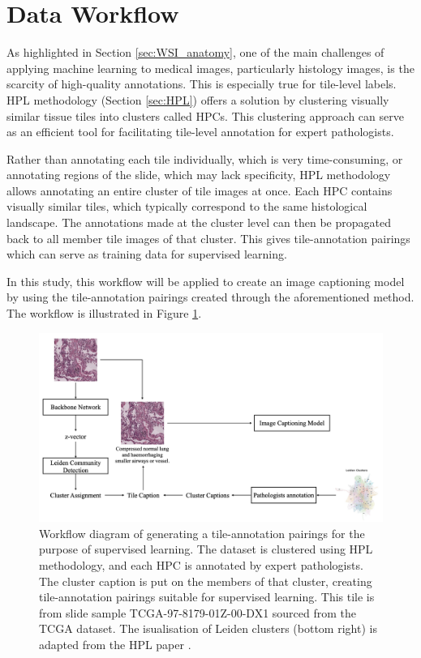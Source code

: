 \documentclass{l4proj}
\begin{document}
\section{Data Workflow} \label{sec:data-workflow}
As highlighted in Section \ref{sec:WSI_anatomy}, one of the main challenges of applying machine learning to medical images, particularly histology images, is the scarcity of high-quality annotations. This is especially true for tile-level labels. HPL methodology (Section \ref{sec:HPL}) offers a solution by clustering visually similar tissue tiles into clusters called HPCs. This clustering approach can serve as an efficient tool for facilitating tile-level annotation for expert pathologists.

Rather than annotating each tile individually, which is very time-consuming, or annotating regions of the slide, which may lack specificity, HPL methodology allows annotating an entire cluster of tile images at once. Each HPC contains visually similar tiles, which typically correspond to the same histological landscape. The annotations made at the cluster level can then be propagated back to all member tile images of that cluster. This gives tile-annotation pairings which can serve as training data for supervised learning.

In this study, this workflow will be applied to create an image captioning model by using the tile-annotation pairings created through the aforementioned method. The workflow is illustrated in Figure \ref{fig:data-workflow}. 

\begin{figure}[h]
    \centering
    \includegraphics[width=1\linewidth]{images/workflow_diagram.png}
    \caption{Workflow diagram of generating a tile-annotation pairings for the purpose of supervised learning. The dataset is clustered using HPL methodology, and each HPC is annotated by expert pathologists. The cluster caption is put on the members of that cluster, creating tile-annotation pairings suitable for supervised learning. This tile is from slide sample TCGA-97-8179-01Z-00-DX1 sourced from the TCGA dataset. The isualisation of Leiden clusters (bottom right) is adapted from the HPL paper \citep{ClaudioQuiros2024}.}
    \label{fig:data-workflow}
\end{figure}
\end{document}
